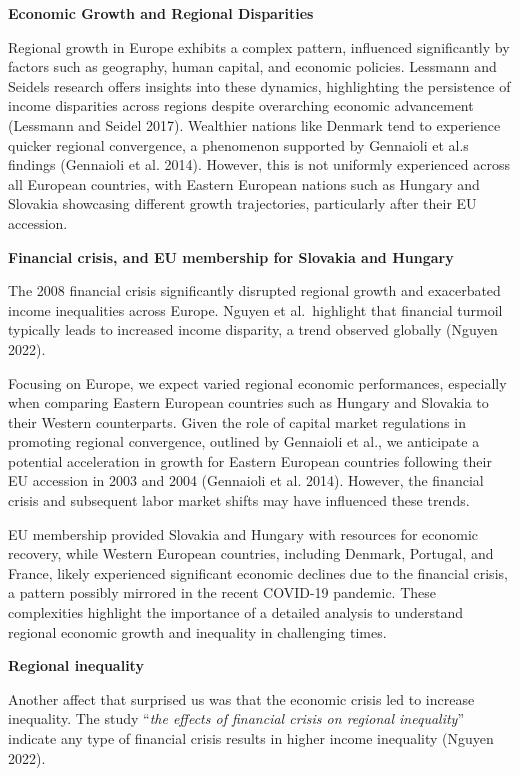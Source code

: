 \documentclass[
  a4paper,
  DIV=11,
  numbers=noendperiod]{scrartcl}
\begin{document}
\textbf{Economic Growth and Regional Disparities}

Regional growth in Europe exhibits a complex pattern, influenced
significantly by factors such as geography, human capital, and economic
policies. Lessmann and Seidel\textquotesingle s research offers insights
into these dynamics, highlighting the persistence of income disparities
across regions despite overarching economic advancement (Lessmann and
Seidel 2017). Wealthier nations like Denmark tend to experience quicker
regional convergence, a phenomenon supported by Gennaioli et
al.\textquotesingle s findings (Gennaioli et al. 2014). However, this is
not uniformly experienced across all European countries, with Eastern
European nations such as Hungary and Slovakia showcasing different
growth trajectories, particularly after their EU accession.

\textbf{Financial crisis, and EU membership for Slovakia and Hungary}

The 2008 financial crisis significantly disrupted regional growth and
exacerbated income inequalities across Europe. Nguyen et al.~highlight
that financial turmoil typically leads to increased income disparity, a
trend observed globally (Nguyen 2022).

Focusing on Europe, we expect varied regional economic performances,
especially when comparing Eastern European countries such as Hungary and
Slovakia to their Western counterparts. Given the role of capital market
regulations in promoting regional convergence, outlined by Gennaioli et
al., we anticipate a potential acceleration in growth for Eastern
European countries following their EU accession in 2003 and 2004
(Gennaioli et al. 2014). However, the financial crisis and subsequent
labor market shifts may have influenced these trends.

EU membership provided Slovakia and Hungary with resources for economic
recovery, while Western European countries, including Denmark, Portugal,
and France, likely experienced significant economic declines due to the
financial crisis, a pattern possibly mirrored in the recent COVID-19
pandemic. These complexities highlight the importance of a detailed
analysis to understand regional economic growth and inequality in
challenging times.

\textbf{Regional inequality}

Another affect that surprised us was that the economic crisis led to
increase inequality. The study ``\emph{the effects of financial crisis
on regional inequality}'' indicate any type of financial crisis results
in higher income inequality (Nguyen 2022).
\end{document}
